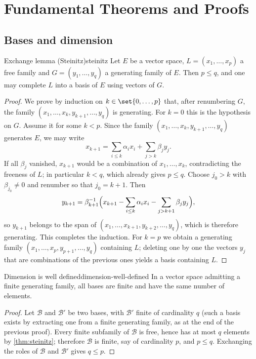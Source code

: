 \chapter{Fundamental Theorems and Proofs}
\label{ch:theorems}

\section{Bases and dimension}

\begin{theorem}{Exchange lemma (Steinitz)}{steinitz}
Let $E$ be a vector space, $L=(x_1,\dots,x_p)$ a free family and
$G=(y_1,\dots,y_q)$ a generating family of $E$. Then $p\leq q$, and one may
complete $L$ into a basis of $E$ using vectors of $G$.
\end{theorem}

\begin{proof}
We prove by induction on $k\in\set{0,\dots,p}$ that, after renumbering $G$, the
family $(x_1,\dots,x_k,y_{k+1},\dots,y_q)$ is generating. For $k=0$ this is the
hypothesis on $G$. Assume it for some $k<p$. Since the family
$(x_1,\dots,x_k,y_{k+1},\dots,y_q)$ generates $E$, we may write
\[
  x_{k+1}=\sum_{i\leq k}\alpha_i x_i+\sum_{j>k}\beta_j y_j .
\]
If all $\beta_j$ vanished, $x_{k+1}$ would be a combination of $x_1,\dots,x_k$,
contradicting the freeness of $L$; in particular $k<q$, which already gives
$p\leq q$. Choose $j_0>k$ with $\beta_{j_0}\neq0$ and renumber so that $j_0=k+1$.
Then
\[
  y_{k+1}=\beta_{k+1}^{-1}\Bigl(x_{k+1}-\sum_{i\leq k}\alpha_i x_i-\sum_{j>k+1}\beta_j y_j\Bigr),
\]
so $y_{k+1}$ belongs to the span of $(x_1,\dots,x_{k+1},y_{k+2},\dots,y_q)$,
which is therefore generating. This completes the induction. For $k=p$ we obtain
a generating family $(x_1,\dots,x_p,y_{p+1},\dots,y_q)$ containing $L$; deleting
one by one the vectors $y_j$ that are combinations of the previous ones yields a
basis containing $L$.
\end{proof}

\begin{theorem}{Dimension is well defined}{dimension-well-defined}
In a vector space admitting a finite generating family, all bases are finite and
have the same number of elements.
\end{theorem}

\begin{proof}
Let $\mathcal{B}$ and $\mathcal{B}'$ be two bases, with $\mathcal{B}'$ finite of
cardinality $q$ (such a basis exists by extracting one from a finite generating
family, as at the end of the previous proof). Every finite subfamily of
$\mathcal{B}$ is free, hence has at most $q$ elements by \cref{thm:steinitz};
therefore $\mathcal{B}$ is finite, say of cardinality $p$, and $p\leq q$.
Exchanging the roles of $\mathcal{B}$ and $\mathcal{B}'$ gives $q\leq p$.
\end{proof}

